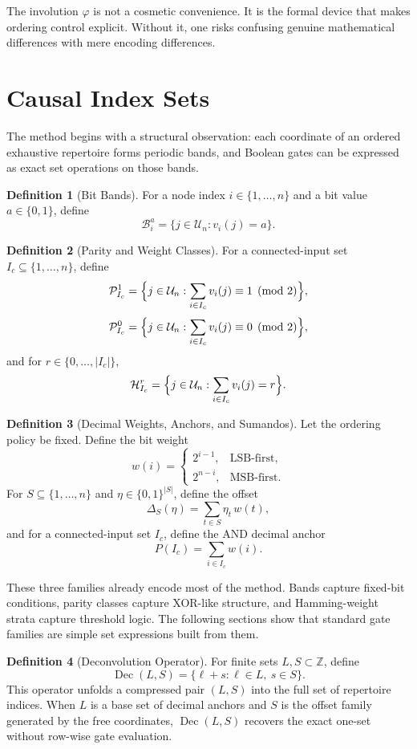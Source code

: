 \documentclass[11pt]{article}
\theoremstyle{definition}
\newtheorem{definition}{Definition}
\newcommand{\U}{\mathcal{U}_n}
\newcommand{\Ic}{I_c}
\newcommand{\Band}[2]{\mathcal{B}_{#1}^{#2}}
\newcommand{\Parity}[2]{\mathcal{P}_{#1}^{#2}}
\newcommand{\Weight}[2]{\mathcal{H}_{#1}^{#2}}
\newcommand{\bits}{\{0,1\}}
\begin{document}
The involution \(\varphi\) is not a cosmetic convenience. It is the formal device that makes ordering control explicit. Without it, one risks confusing genuine mathematical differences with mere encoding differences.

\section{Causal Index Sets}
The method begins with a structural observation: each coordinate of an ordered exhaustive repertoire forms periodic bands, and Boolean gates can be expressed as exact set operations on those bands.

\begin{definition}[Bit Bands]
For a node index \(i\in\{1,\dots,n\}\) and a bit value \(a\in\bits\), define
\[
\Band{i}{a}=\{j\in\U : v_i(j)=a\}.
\]
\end{definition}

\begin{definition}[Parity and Weight Classes]
For a connected-input set \(\Ic\subseteq\{1,\dots,n\}\), define
\[
\Parity{\Ic}{1}=\Bigl\{j\in\U : \sum_{i\in\Ic} v_i(j)\equiv 1 \pmod 2 \Bigr\},
\]
\[
\Parity{\Ic}{0}=\Bigl\{j\in\U : \sum_{i\in\Ic} v_i(j)\equiv 0 \pmod 2 \Bigr\},
\]
and for \(r\in\{0,\dots,|\Ic|\}\),
\[
\Weight{\Ic}{r}=\Bigl\{j\in\U : \sum_{i\in\Ic} v_i(j)=r \Bigr\}.
\]
\end{definition}

\begin{definition}[Decimal Weights, Anchors, and Sumandos]
Let the ordering policy be fixed. Define the bit weight
\[
w(i)=
\begin{cases}
2^{i-1}, & \text{LSB-first},\\
2^{n-i}, & \text{MSB-first}.
\end{cases}
\]
For \(S\subseteq\{1,\dots,n\}\) and \(\eta\in\bits^{|S|}\), define the offset
\[
\Delta_S(\eta)=\sum_{t\in S}\eta_t\,w(t),
\]
and for a connected-input set \(\Ic\), define the AND decimal anchor
\[
P(\Ic)=\sum_{i\in\Ic} w(i).
\]
\end{definition}

These three families already encode most of the method. Bands capture fixed-bit conditions,
parity classes capture XOR-like structure, and Hamming-weight strata capture threshold logic.
The following sections show that standard gate families are simple set expressions built from them.

\begin{definition}[Deconvolution Operator]
For finite sets \(L,S\subset\mathbb{Z}\), define
\[
\operatorname{Dec}(L,S)=\{\ell+s:\ell\in L,\ s\in S\}.
\]
This operator unfolds a compressed pair \((L,S)\) into the full set of repertoire indices.
When \(L\) is a base set of decimal anchors and \(S\) is the offset family generated by the
free coordinates, \(\operatorname{Dec}(L,S)\) recovers the exact one-set without row-wise
gate evaluation.
\end{definition}
\end{document}
